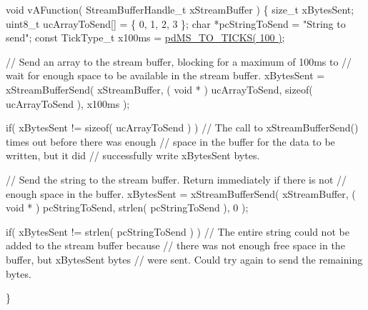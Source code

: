 \begin{DoxyPre}
\begin{DoxyPre}
\begin{DoxyPre}
void vAFunction( StreamBufferHandle\_t xStreamBuffer )
\{
size\_t xBytesSent;
uint8\_t ucArrayToSend[] = \{ 0, 1, 2, 3 \};
char *pcStringToSend = "String to send";
const TickType\_t x100ms = \hyperlink{projdefs_8h_a353d0f62b82a402cb3db63706c81ec3f}{pdMS\_TO\_TICKS( 100 )};
\begin{DoxyVerb}// Send an array to the stream buffer, blocking for a maximum of 100ms to
// wait for enough space to be available in the stream buffer.
xBytesSent = xStreamBufferSend( xStreamBuffer, ( void * ) ucArrayToSend, sizeof( ucArrayToSend ), x100ms );

if( xBytesSent != sizeof( ucArrayToSend ) )
{
    // The call to xStreamBufferSend() times out before there was enough
    // space in the buffer for the data to be written, but it did
    // successfully write xBytesSent bytes.
}

// Send the string to the stream buffer.  Return immediately if there is not
// enough space in the buffer.
xBytesSent = xStreamBufferSend( xStreamBuffer, ( void * ) pcStringToSend, strlen( pcStringToSend ), 0 );

if( xBytesSent != strlen( pcStringToSend ) )
{
    // The entire string could not be added to the stream buffer because
    // there was not enough free space in the buffer, but xBytesSent bytes
    // were sent.  Could try again to send the remaining bytes.
}
\end{DoxyVerb}

\}
\end{DoxyPre}
 \end{DoxyPre}
\end{DoxyPre}
